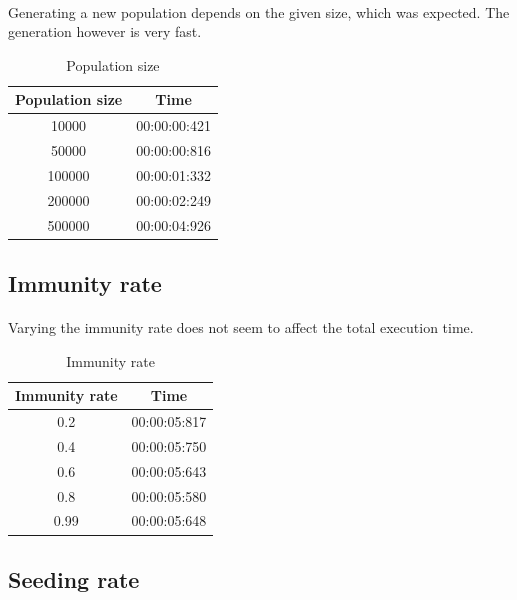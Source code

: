 \documentclass[runningheads]{llncs}
\begin{document}
\paragraph{} Generating a new population depends on the given size, which was expected. The generation however is very fast.
\begin{table}[!h]
	\centering
	\begin{tabular}{|c|c|}
		\hline
		Population size & Time \\\hline
	    10000  & 00:00:00:421 \\\hline
	    50000  & 00:00:00:816 \\\hline
	    100000 & 00:00:01:332 \\\hline
 	    200000 & 00:00:02:249 \\\hline
 	    500000 & 00:00:04:926 \\
    	\hline
	\end{tabular}
	\caption{Population size}
\end{table}

\subsection{Immunity rate}

\paragraph{} Varying the immunity rate does not seem to affect the total execution time.
\begin{table}[!h]
	\centering
	\begin{tabular}{|c|c|}
		\hline
		Immunity rate & Time \\\hline
    	0.2  & 00:00:05:817 \\\hline
    	0.4  & 00:00:05:750 \\\hline
    	0.6  & 00:00:05:643 \\\hline
    	0.8  & 00:00:05:580 \\\hline
    	0.99 & 00:00:05:648 \\
    	\hline
	\end{tabular}
	\caption{Immunity rate}
\end{table}

\subsection{Seeding rate}
\end{document}
